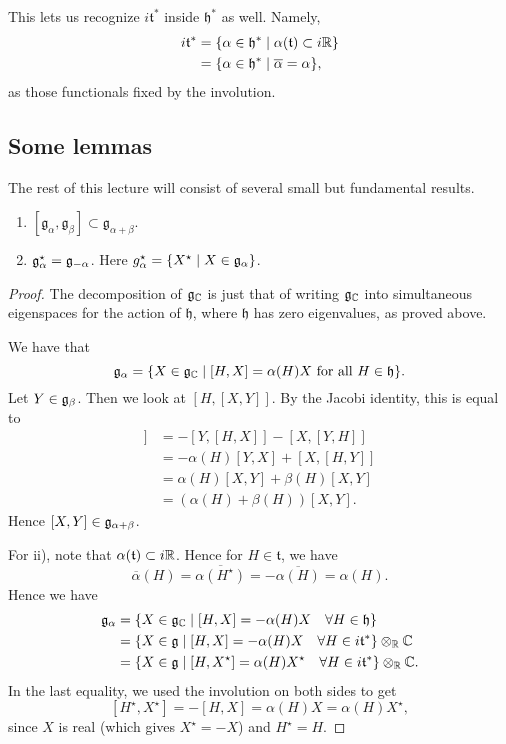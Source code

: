 \documentclass[11pt, english]{article}
\begin{document}
This lets us recognize $i \mathfrak t^\ast$ inside $\mathfrak h^\ast$ as well. Namely,
\begin{align*}
  i \mathfrak t^\ast &= \{ \alpha \in \mathfrak h^\ast \mid \alpha(\mathfrak t) \subset i \mathbb{R} \} \\
&= \{ \alpha \in \mathfrak h ^\ast \mid \overline \alpha = \alpha \},
\end{align*}
as those functionals fixed by the involution.

\subsection{Some lemmas}

The rest of this lecture will consist of several small but fundamental results.

\begin{lemma}
\label{lemmadecomp}
  \begin{enumerate}
We have a decomposition $$\g_\C = \mathfrak h \oplus \bigoplus_{\alpha \in \Delta} \g_\alpha.$$ Also:
  \item $[\mathfrak g_\alpha, \mathfrak g_\beta] \subset \mathfrak g_{\alpha+\beta}$.
\item $\mathfrak g_\alpha^\star = \mathfrak g_{-\alpha}$. Here $g_\alpha^\star = \{ X^\star \mid X \in \mathfrak g_\alpha \}$.
  \end{enumerate}
\end{lemma}
\begin{proof}
The decomposition of $\mathfrak g_{\mathbb{C}}$ is just that of writing $\mathfrak g_{\mathbb{C}}$ into simultaneous eigenspaces for the action of $\mathfrak h$, where $\mathfrak h$ has zero eigenvalues, as proved above.

We have that 
$$
\mathfrak g_\alpha = \{ X \in \mathfrak g_{\mathbb{C}} \mid [H,X] = \alpha(H) X \text{ for all } H \in \mathfrak h\}.
$$
Let $Y \in \mathfrak g_\beta$. Then we look at $[H,[X,Y]]$. By the Jacobi identity, this is equal to
\begin{align*}
  [H,[X,Y]] &= -[Y,[H,X]] - [X,[Y,H]] \\
&= -\alpha(H)[Y,X] +[X,[H,Y]] \\
&= \alpha(H)[X,Y] +\beta(H)[X,Y] \\
&= (\alpha(H)+\beta(H))[X,Y].
\end{align*}
Hence $[X,Y] \in \mathfrak g_{\alpha+\beta}$.

For ii), note that $\alpha(\mathfrak t) \subset i \mathbb{R}$. Hence for $H \in \mathfrak t$, we have 
$$
\overline \alpha(H) = \overline{\alpha(H^\star)} = - \overline{\alpha(H)} = \alpha(H).
$$
Hence we have
\begin{align*}
\mathfrak g_\alpha &= \{ X \in \mathfrak g_{\mathbb{C}} \mid [H,X] = -\alpha(H)X \quad \forall H \in \mathfrak h \} \\
&= \{ X \in \mathfrak g \mid [H,X] = -\alpha(H) X \quad \forall H \in i \mathfrak t^\ast \} \otimes_{\mathbb{R}} \mathbb{C}  \\
&= \{ X \in \mathfrak g \mid [H,X^\star] = \alpha(H) X^\star \quad \forall H \in i \mathfrak t ^\ast \} \otimes_{\mathbb{R}} \mathbb{C}.
\end{align*}
In the last equality, we used the involution on both sides to get
$$
[H^\star, X^\star] = -[H,X] = \alpha(H) X = \alpha(H) X^\star,
$$
since $X$ is real (which gives $X^\star = -X$) and $H^\star=H$.
\end{proof}
\end{document}
